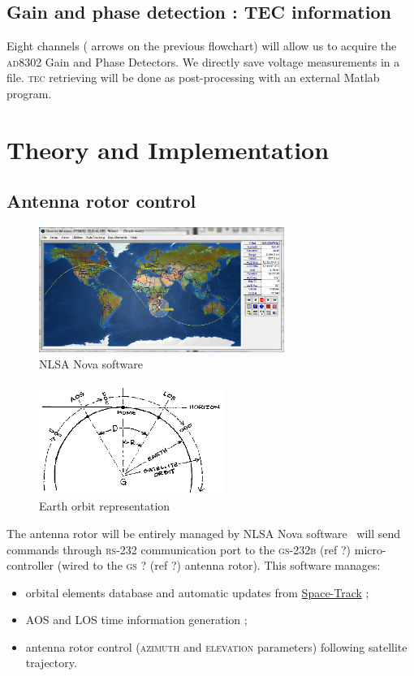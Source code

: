 \documentclass[twocolumn,pre,floats,aps,amsmath,amssymb]{revtex4}
\begin{document}
\subsection{Gain and phase detection : TEC information}

Eight channels ({ \color{oneblue}{blue} } arrows on the previous flowchart) will allow us to acquire the \textsc{ad8302} Gain and Phase Detectors. We directly save voltage measurements in a file. \textsc{tec} retrieving will be done as post-processing with an external Matlab program.

\section{Theory and Implementation}
\label{sec:theory}

\subsection{Antenna rotor control}

\begin{figure}[h]
  \includegraphics[width=8cm]{pictures/nova3.png}
\caption{NLSA Nova software}
\label{fig:nlsa_nova}
\end{figure}

\begin{figure}[h]
  \includegraphics[width=6cm]{pictures/orbitdra.png}
\caption{Earth orbit representation}
\label{fig:aos_los}
\end{figure}

The antenna rotor will be entirely managed by NLSA Nova software~\cite{nova_um} will send commands through \textsc{rs-232} communication port to the \textsc{gs-232b} (ref ?) micro-controller (wired to the \textsc{gs ?} (ref ?) antenna rotor). This software manages:
\begin {itemize}
\item {orbital elements database and automatic updates from \href{https://www.space-track.org}{Space-Track} ;}
\item {AOS and LOS time information generation ;}
\item {antenna rotor control (\textsc{azimuth} and \textsc{elevation} parameters) following satellite trajectory.}
\end {itemize}
\end{document}
